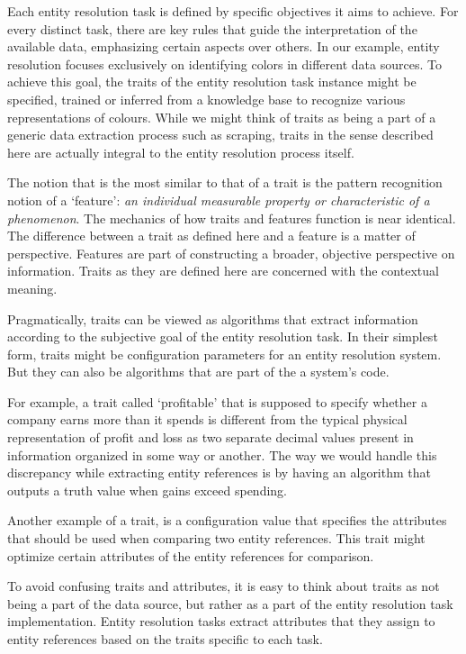 Each entity resolution task is defined by specific objectives it aims to
achieve.
For every distinct task, there are key rules that guide the interpretation
of the available data, emphasizing certain aspects over others.
In our example, entity resolution focuses exclusively on identifying colors
in different data sources.
To achieve this goal, the traits of the entity resolution task instance
might be specified, trained or inferred from a knowledge base to recognize
various representations of colours.
While we might think of traits as being a part of a generic data extraction
process such as scraping, traits in the sense described here are actually
integral to the entity resolution process itself.

The notion that is the most similar to that of a trait is the pattern
recognition notion of a `feature':
\textit{an individual measurable property or characteristic of a
phenomenon}\cite{bishop2006pattern}.
The mechanics of how traits and features function is near identical.
The difference between a trait as defined here and a feature is a matter of
perspective.
Features are part of constructing a broader, objective perspective on
information.
Traits as they are defined here are concerned with the contextual meaning.

Pragmatically, traits can be viewed as algorithms that extract information
according to the subjective goal of the entity resolution task.
In their simplest form, traits might be configuration parameters for an
entity resolution system.
But they can also be algorithms that are part of the a system's code.

For example, a trait called `profitable' that is supposed to specify whether
a company earns more than it spends is different from the typical physical
representation of profit and loss as two separate decimal values present
in information organized in some way or another.
The way we would handle this discrepancy while extracting entity references
is by having an algorithm that outputs a truth value when gains exceed
spending.

Another example of a trait, is a configuration value that specifies the
attributes that should be used when comparing two entity references.
This trait might optimize certain attributes of the entity references for
comparison.

To avoid confusing traits and attributes, it is easy to think about traits
as not being a part of the data source, but rather as a part of the entity
resolution task implementation.
Entity resolution tasks extract attributes that they assign to entity
references based on the traits specific to each task.

